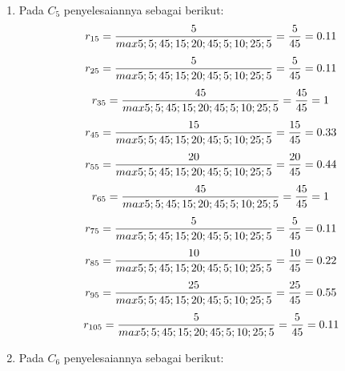 \begin{enumerate}
\item Pada $C_{5}$ penyelesaiannya sebagai berikut:
\begin{displaymath}
r_{15} = \frac{5}{max {5;5;45;15;20;45;5;10;25;5}} = \frac{5}{45} = 0.11\\
\end {displaymath}
\begin{displaymath}
r_{25} = \frac{5}{max {5;5;45;15;20;45;5;10;25;5}} = \frac{5}{45} = 0.11\\
\end{displaymath}
\begin{displaymath}
r_{35} = \frac{45}{max {5;5;45;15;20;45;5;10;25;5}} = \frac{45}{45} = 1\\
\end {displaymath}
\begin{displaymath}
r_{45} = \frac{15}{max {5;5;45;15;20;45;5;10;25;5}} = \frac{15}{45} = 0.33\\
\end {displaymath}
\begin{displaymath}
r_{55} = \frac{20}{max {5;5;45;15;20;45;5;10;25;5}} = \frac{20}{45} = 0.44\\
\end {displaymath}
\begin{displaymath}
r_{65} = \frac{45}{max {5;5;45;15;20;45;5;10;25;5}} = \frac{45}{45} = 1\\
\end {displaymath}
\begin{displaymath}
r_{75} = \frac{5}{max {5;5;45;15;20;45;5;10;25;5}} = \frac{5}{45} = 0.11\\
\end {displaymath}
\begin{displaymath}
r_{85} = \frac{10}{max {5;5;45;15;20;45;5;10;25;5}} = \frac{10}{45} = 0.22\\
\end {displaymath}
\begin{displaymath}
r_{95} = \frac{25}{max {5;5;45;15;20;45;5;10;25;5}} = \frac{25}{45} = 0.55\\
\end {displaymath}
\begin{displaymath}
r_{105} = \frac{5}{max {5;5;45;15;20;45;5;10;25;5}} = \frac{5}{45} = 0.11\\
\end {displaymath}
\item Pada $C_{6}$ penyelesaiannya sebagai berikut:
\begin{displaymath}

\end{displaymath}
\end{enumerate}
